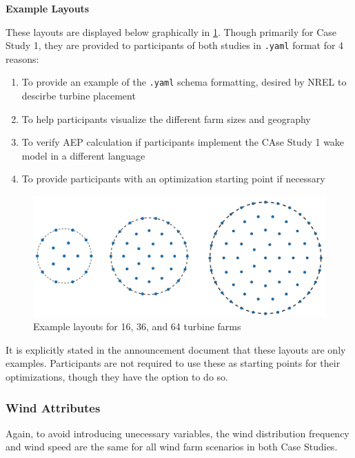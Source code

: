\vspace{3mm}
\noindent\textbf{Example Layouts}

	\noindent These layouts are displayed below graphically in \cref{fig:exlayouts}. Though primarily for Case Study 1, they are provided to participants of both studies in \texttt{.yaml} format for 4 reasons:

	\begin{enumerate}
		\item To provide an example of the \texttt{.yaml} schema formatting, desired by NREL to descirbe turbine placement
		\item To help participants visualize the different farm sizes and geography
		\item To verify AEP calculation if participants implement the CAse Study 1 wake model in a different language
		\item To provide participants with an optimization starting point if necessary
	\end{enumerate}

	\begin{figure}[H]
		\centering
			\includegraphics[width=\textwidth]{./figures/iea37-exfarms.pdf}
		\caption{Example layouts for 16, 36, and 64 turbine farms}
		\label{fig:exlayouts}
	\end{figure}

	It is explicitly stated in the announcement document that these layouts are only examples.
	Participants are not required to use these as starting points for their optimizations, though they have the option to do so.

\subsubsection{Wind Attributes}

	Again, to avoid introducing unecessary variables, the wind distribution frequency and wind speed are the same for all wind farm scenarios in both Case Studies.

